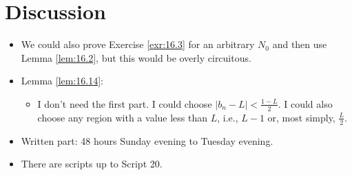 \documentclass{report}
\begin{document}



\section{Discussion}
\begin{itemize}
    \item {}We could also prove Exercise \ref{exr:16.3} for an arbitrary $N_0$ and then use Lemma \ref{lem:16.2}, but this would be overly circuitous.
    \item {}Lemma \ref{lem:16.14}:
    \begin{itemize}
        \item I don't need the first part. I could choose $|b_n-L|<\frac{1-L}{2}$. I could also choose any region with a value less than $L$, i.e., $L-1$ or, most simply, $\frac{L}{2}$.
    \end{itemize}
    \item Written part: 48 hours Sunday evening to Tuesday evening.
    \item There are scripts up to Script 20.
\end{itemize}



\renewcommand{\chaptermark}[1]{\markboth{#1}{}}

\end{document}
